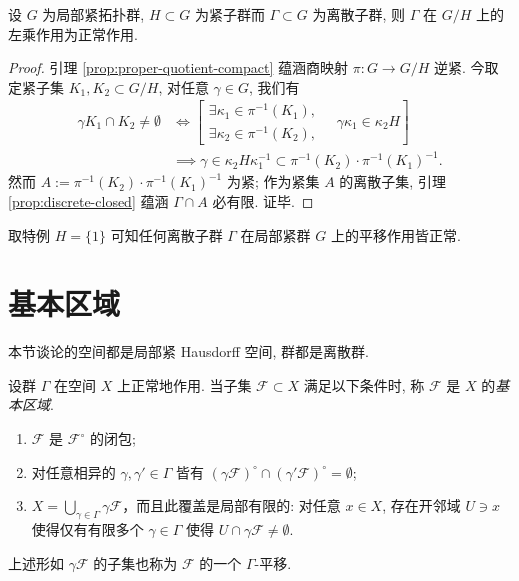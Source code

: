 \begin{proposition}\label{prop:discrete-group-discontinuous}
	设 $G$ 为局部紧拓扑群, $H \subset G$ 为紧子群而 $\Gamma \subset G$ 为离散子群, 则 $\Gamma$ 在 $G/H$ 上的左乘作用为正常作用.
\end{proposition}
\begin{proof}
	引理 \ref{prop:proper-quotient-compact} 蕴涵商映射 $\pi: G \to G/H$ 逆紧. 今取定紧子集 $K_1, K_2 \subset G/H$, 对任意 $\gamma \in G$, 我们有
	\begin{align*}
		\gamma K_1 \cap K_2 \neq \emptyset & \iff \left[ \begin{array}{ll} \exists \kappa_1 \in \pi^{-1}(K_1), \\ \exists \kappa_2 \in \pi^{-1}(K_2), \end{array} \quad \gamma \kappa_1 \in \kappa_2 H \right] \\
		& \implies \gamma \in \kappa_2 H \kappa_1^{-1} \subset \pi^{-1}(K_2) \cdot  \pi^{-1}(K_1)^{-1}.
	\end{align*}
	然而 $A := \pi^{-1}(K_2) \cdot \pi^{-1}(K_1)^{-1}$ 为紧; 作为紧集 $A$ 的离散子集, 引理 \ref{prop:discrete-closed} 蕴涵 $\Gamma \cap A$ 必有限. 证毕.
\end{proof}

取特例 $H = \{1\}$ 可知任何离散子群 $\Gamma$ 在局部紧群 $G$ 上的平移作用皆正常.

\section{基本区域}\label{sec:fundamental-domain}
本节谈论的空间都是局部紧 Hausdorff 空间, 群都是离散群.

\begin{definition}\label{def:fundamental-domain} 
	设群 $\Gamma$ 在空间 $X$ 上正常地作用. 当子集 $\mathcal{F} \subset X$ 满足以下条件时, 称 $\mathcal{F}$ 是 $X$ 的\emph{基本区域}.
	\begin{enumerate}[\bfseries {F}.1]
		\item $\mathcal{F}$ 是 $\mathcal{F}^\circ$ 的闭包;
		\item 对任意相异的 $\gamma, \gamma' \in \Gamma$ 皆有 $(\gamma \mathcal{F})^\circ \cap (\gamma' \mathcal{F})^\circ = \emptyset$;
		\item $X = \bigcup_{\gamma \in \Gamma} \gamma \mathcal{F}$，而且此覆盖是局部有限的: 对任意 $x \in X$, 存在开邻域 $U \ni x$ 使得仅有有限多个 $\gamma \in \Gamma$ 使得 $U \cap \gamma\mathcal{F} \neq \emptyset$. 
	\end{enumerate}
	上述形如 $\gamma \mathcal{F}$ 的子集也称为 $\mathcal{F}$ 的一个 $\Gamma$-平移.
\end{definition}

